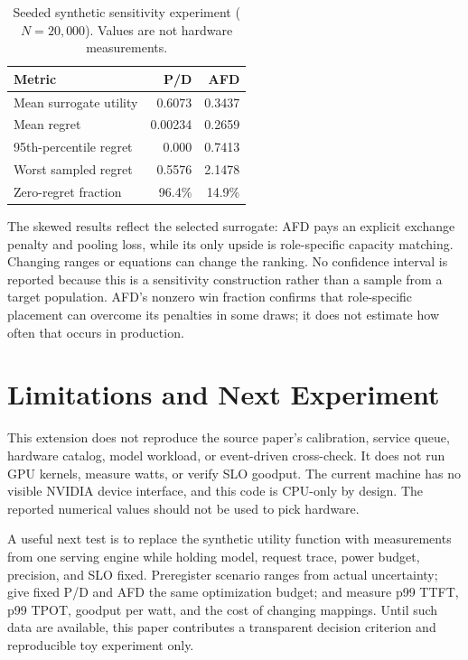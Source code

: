 \documentclass[11pt]{article}
\begin{document}
\begin{table}[t]
\centering
\small
\begin{tabular}{lrr}
\toprule
Metric & P/D & AFD \\
\midrule
Mean surrogate utility & 0.6073 & 0.3437 \\
Mean regret & 0.00234 & 0.2659 \\
95th-percentile regret & 0.000 & 0.7413 \\
Worst sampled regret & 0.5576 & 2.1478 \\
Zero-regret fraction & 96.4\% & 14.9\% \\
\bottomrule
\end{tabular}
\caption{Seeded synthetic sensitivity experiment ($N=20{,}000$). Values are not hardware measurements.}
\end{table}

The skewed results reflect the selected surrogate: AFD pays an explicit exchange penalty and pooling loss, while its only upside is role-specific capacity matching. Changing ranges or equations can change the ranking. No confidence interval is reported because this is a sensitivity construction rather than a sample from a target population. AFD's nonzero win fraction confirms that role-specific placement can overcome its penalties in some draws; it does not estimate how often that occurs in production.

\section{Limitations and Next Experiment}
This extension does not reproduce the source paper's calibration, service queue, hardware catalog, model workload, or event-driven cross-check. It does not run GPU kernels, measure watts, or verify SLO goodput. The current machine has no visible NVIDIA device interface, and this code is CPU-only by design. The reported numerical values should not be used to pick hardware.

A useful next test is to replace the synthetic utility function with measurements from one serving engine while holding model, request trace, power budget, precision, and SLO fixed. Preregister scenario ranges from actual uncertainty; give fixed P/D and AFD the same optimization budget; and measure p99 TTFT, p99 TPOT, goodput per watt, and the cost of changing mappings. Until such data are available, this paper contributes a transparent decision criterion and reproducible toy experiment only.


\end{document}

